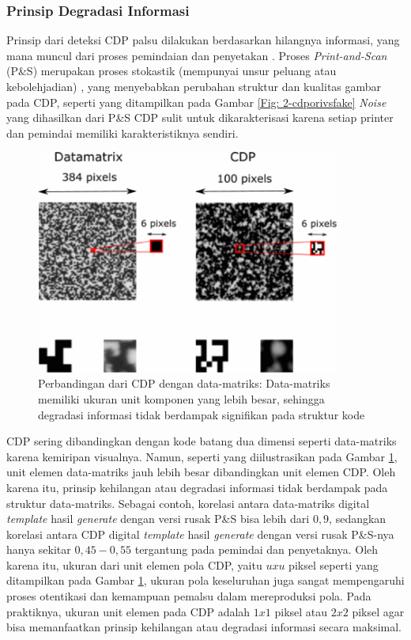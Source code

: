 \subsubsection{Prinsip Degradasi Informasi}
Prinsip dari deteksi CDP palsu dilakukan berdasarkan hilangnya informasi, yang mana muncul dari proses pemindaian dan penyetakan \cite{picard2004digital}. Proses \emph{Print-and-Scan} (P\&S) merupakan proses stokastik (mempunyai unsur peluang atau kebolehjadian) \cite{phan2014document}, yang menyebabkan perubahan struktur dan kualitas gambar pada CDP, seperti yang ditampilkan pada Gambar \ref{Fig: 2-cdporivsfake} \emph{Noise} yang dihasilkan dari P\&S CDP sulit untuk dikarakterisasi \cite{picard2008security} karena setiap printer dan pemindai memiliki karakteristiknya sendiri.

\begin{figure}[h]
	\centering
	\includegraphics[width=10cm]{contents/chapter-2/2-datamatrixvscdp.png}
	\caption{Perbandingan dari CDP dengan data-matriks: Data-matriks memiliki ukuran unit komponen yang lebih besar, sehingga degradasi informasi tidak berdampak signifikan pada struktur kode \cite{PICARDCANCOPYDETECTIONPATTERN}}
	\label{Fig: 2-datamatrixvscdp}
\end{figure}

CDP sering dibandingkan dengan kode batang dua dimensi seperti data-matriks karena kemiripan visualnya. Namun, seperti yang diilustrasikan pada Gambar \ref{Fig: 2-datamatrixvscdp}, unit elemen data-matriks jauh lebih besar dibandingkan unit elemen CDP. Oleh karena itu, prinsip kehilangan atau degradasi informasi tidak berdampak pada struktur data-matriks. Sebagai contoh, korelasi antara data-matriks digital \emph{template} hasil \emph{generate} dengan versi rusak P\&S bisa lebih dari $0,9$, sedangkan korelasi antara CDP digital \emph{template} hasil \emph{generate} dengan versi rusak P\&S-nya hanya sekitar $0,45-0,55$ tergantung pada pemindai dan penyetaknya. Oleh karena itu, ukuran dari unit elemen pola CDP, yaitu $uxu$ piksel seperti yang ditampilkan pada Gambar \ref{Fig: 2-datamatrixvscdp}, ukuran pola keseluruhan juga sangat mempengaruhi proses otentikasi dan kemampuan pemalsu dalam mereproduksi pola. Pada praktiknya, ukuran unit elemen pada CDP adalah $1x1$ piksel atau $2x2$ piksel agar bisa memanfaatkan prinsip kehilangan atau degradasi informasi secara maksimal.

